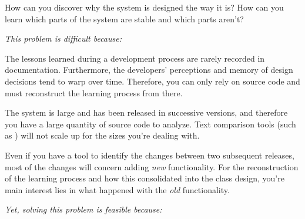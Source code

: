 \documentclass[a4paper,10pt,twoside]{book}
\begin{document}
How can you discover why the system is designed the way it is? How can you learn which parts of the system are stable and which parts aren't?

\emph{This problem is difficult because:}

\begin{bulletlist}
\item The lessons learned during a development process are rarely recorded in documentation. Furthermore, the developers' perceptions and memory of design decisions tend to warp over time. Therefore, you can only rely on source code and must reconstruct the learning process from there.

\item The system is large and has been released in successive versions, and therefore you have a large quantity of source code to analyze. Text comparison tools (such as  ) will not scale up for the sizes you're dealing with.

\item Even if you have a tool to identify the changes between two subsequent releases, most of the changes will concern adding \emph{new} functionality. For the reconstruction of the learning process and how this consolidated into the class design, you're main interest lies in what happened with the \emph{old} functionality.
\end{bulletlist}

\emph{Yet, solving this problem is feasible because:}
\end{document}
